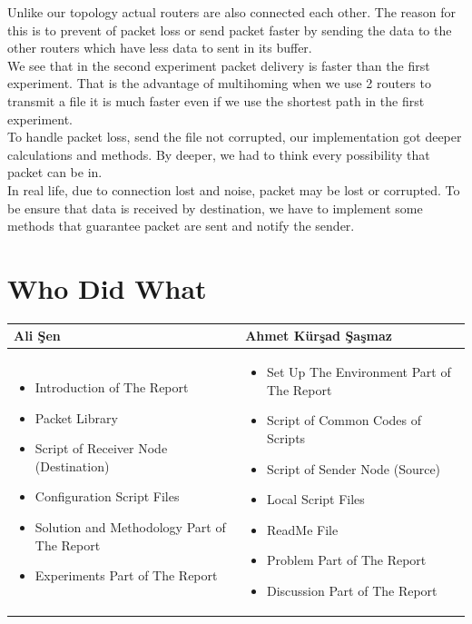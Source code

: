 \documentclass[conference]{IEEEtran}
\begin{document}
Unlike our topology actual routers are also connected each other. The reason for this is to prevent of packet loss or send packet faster by sending the data to the other routers which have less data to sent in its buffer. \\

We see that in the second experiment packet delivery is faster than the first experiment. That is the advantage of multihoming when we use 2 routers to transmit a file it is much faster even if we use the shortest path in the first experiment. \\

To handle packet loss, send the file not corrupted, our implementation got deeper calculations and methods. By deeper, we had to think every possibility that packet can be in. \\

In real life, due to connection lost and noise, packet may be lost or corrupted. To be ensure that data is received by destination, we have to implement some methods that guarantee packet are sent and notify the sender.

\section{Who Did What}
\begin{table}[h]
\centering
\begin{tabular}{|l|l|}
\hline
Ali Şen & Ahmet Kürşad Şaşmaz \\ \hline
\begin{minipage}[h]{0.2\textwidth}
    \begin{itemize}
    \item Introduction of The Report
    \item Packet Library
    \item Script of Receiver Node (Destination)
    \item Configuration Script Files
    \item Solution and Methodology Part of The Report
    \item Experiments Part of The Report
    \end{itemize}
  \end{minipage}
&
\begin{minipage}[h]{0.2\textwidth}
    \begin{itemize}
    \item Set Up The Environment Part of The Report
    \item Script of Common Codes of Scripts
    \item Script of Sender Node (Source)
    \item Local Script Files
    \item ReadMe File
    \item Problem Part of The Report
    \item Discussion Part of The Report
    \end{itemize}
  \end{minipage}
\\ \hline
\end{tabular}
\end{table}
\end{document}
